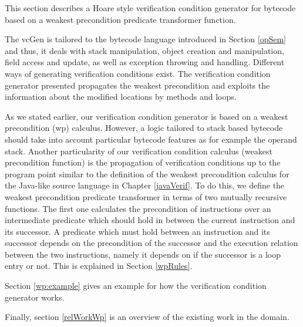 
This section describes a Hoare style verification condition generator for bytecode based on a weakest precondition predicate transformer function.
 

The vcGen is tailored to the bytecode language introduced in Section \ref{opSem} and thus, it deals
with stack manipulation, object creation and manipulation, field access and update, as well as exception throwing and handling.
Different ways of generating verification conditions exist. The verification condition
 generator presented  propagates the weakest precondition and exploits the information 
about the modified locations by methods and loops. 

As we stated earlier, our verification condition generator is based on a weakest precondition (wp) calculus.
 However, a logic tailored to stack based bytecode should take into account 
particular bytecode features as for example the operand stack. Another particularity of our verification condition calculus (weakest precondition function)
is the propagation of verification conditions up to the program point similar to the definition of the weakest precondition calculus
for the Java-like  source language in Chapter \ref{javaVerif}. To do this, we define the  weakest precondition predicate transformer
in terms of two mutually recursive functions. 
The first one calculates the precondition of instructions over an intermediate predicate which should hold 
in between the current instruction and 
its successor. A predicate which must hold between an instruction and its successor 
depends on the precondition of the successor and the execution relation between the two instructions, namely 
it depends on if the successor is a loop entry or not.
This is explained in Section  \ref{wpRules}. 

Section \ref{wp:example} gives an example for how the verification condition generator works.

Finally, section \ref{relWorkWp} is an overview of the existing work in the domain.
 





 
